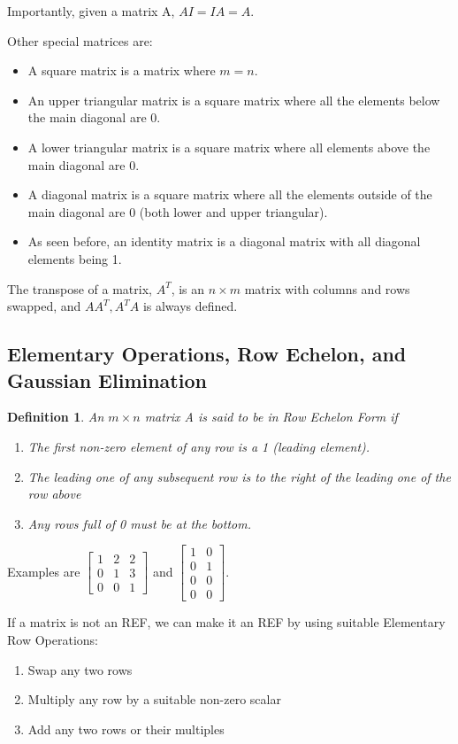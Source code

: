 \documentclass{article}
\newtheorem{definition}{Definition}
\begin{document}
Importantly, given a matrix A, $AI=IA=A$.

Other special matrices are:
\begin{itemize}
	\item A square matrix is a matrix where $m=n$.
	\item An upper triangular matrix is a square matrix where all the elements below the main diagonal are 0.
	\item A lower triangular matrix is a square matrix where all elements above the main diagonal are 0.
	\item A diagonal matrix is a square matrix where all the elements outside of the main diagonal are 0 (both lower and upper triangular).
	\item As seen before, an identity matrix is a diagonal matrix with all diagonal elements being 1.
\end{itemize}

The transpose of a matrix, $A^T$, is an $n\times m$ matrix with columns and rows swapped, and $A A^T, A^T A$ is always defined.


\subsection{Elementary Operations, Row Echelon, and Gaussian Elimination}

\begin{definition}
An $m\times n$ matrix A is said to be in Row Echelon Form if
\begin{enumerate}
	\item The first non-zero element of any row is a 1 (leading element).
	\item The leading one of any subsequent row is to the right of the 
		leading one of the row above
	\item Any rows full of 0 must be at the bottom.
\end{enumerate}
\end{definition}
Examples are $\begin{bmatrix}1&2&2\\0&1&3\\0&0&1\end{bmatrix}$ and 
$\begin{bmatrix}1&0\\0&1\\0&0\\0&0\end{bmatrix}$.

If a matrix is not an REF, we can make it an REF by using suitable Elementary Row Operations:
\begin{enumerate}
	\item Swap any two rows
	\item Multiply any row by a suitable non-zero scalar
	\item Add any two rows or their multiples
\end{enumerate}
\end{document}
